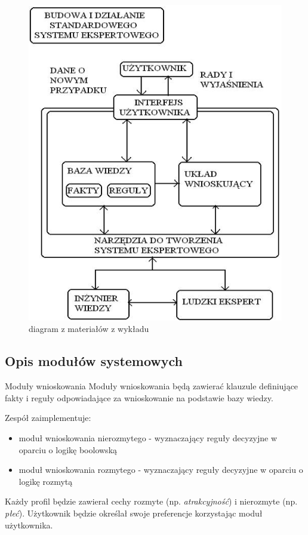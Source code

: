 \documentclass{beamer}
\begin{document}
\begin{frame}
    \begin{figure}
		\centering
		\includegraphics[height=0.85\textheight,keepaspectratio]{images/diagram.png}
		\caption{diagram z materiałów z wykładu}
	\end{figure}
	
\end{frame}

\subsection{Opis modułów systemowych}

\begin{frame}

	\begin{block}{Moduły wnioskowania}
		Moduły wnioskowania będą zawierać klauzule definiujące fakty i reguły odpowiadające za wnioskowanie na podstawie bazy wiedzy. 
		
		Zespół zaimplementuje:
		\begin{itemize}
		    \item moduł wnioskowania nierozmytego - wyznaczający reguły decyzyjne w oparciu o logikę boolowską
			\item moduł wnioskowania rozmytego - wyznaczający reguły decyzyjne w oparciu o logikę rozmytą
		\end{itemize}
		
		Każdy profil będzie zawierał cechy rozmyte (np. \textit{atrakcyjność}) i nierozmyte (np. \textit{płeć}). Użytkownik będzie określał swoje preferencje korzystając moduł użytkownika.
	\end{block}

\end{frame}
\end{document}
